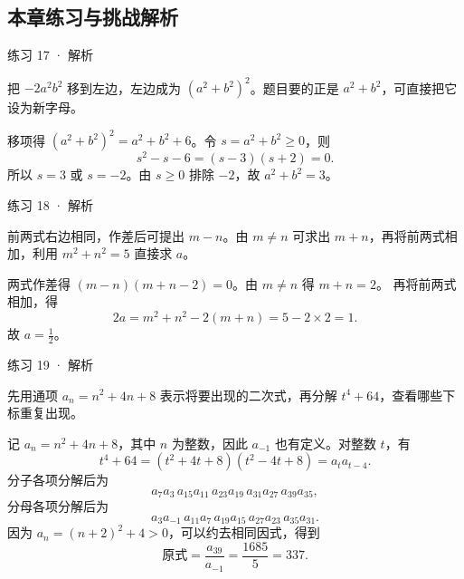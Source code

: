 \subsection*{本章练习与挑战解析}





\begin{solution}[before skip=4pt plus 1pt,after skip=4pt plus 1pt,top=6pt,bottom=6pt]{练习 17 · 解析}

\think 把 $-2a^2b^2$ 移到左边，左边成为 $(a^2+b^2)^2$。题目要的正是 $a^2+b^2$，可直接把它设为新字母。

\solve 移项得 $(a^2+b^2)^2=a^2+b^2+6$。令 $s=a^2+b^2\ge0$，则
\[s^2-s-6=(s-3)(s+2)=0.\]
所以 $s=3$ 或 $s=-2$。由 $s\ge0$ 排除 $-2$，故 $a^2+b^2=3$。


\end{solution}


\begin{solution}[before skip=4pt plus 1pt,after skip=4pt plus 1pt,top=6pt,bottom=6pt]{练习 18 · 解析}

\think 前两式右边相同，作差后可提出 $m-n$。由 $m\ne n$ 可求出 $m+n$，再将前两式相加，利用 $m^2+n^2=5$ 直接求 $a$。

\solve 两式作差得 $(m-n)(m+n-2)=0$。由 $m\ne n$ 得 $m+n=2$。
再将前两式相加，得
\[2a=m^2+n^2-2(m+n)=5-2\times2=1.\]
故 $a=\frac12$。


\end{solution}




\begin{solution}[before skip=4pt plus 1pt,after skip=4pt plus 1pt,top=6pt,bottom=6pt]{练习 19 · 解析}

\think 先用通项 $a_n=n^2+4n+8$ 表示将要出现的二次式，再分解 $t^4+64$，查看哪些下标重复出现。

\solve 记 $a_n=n^2+4n+8$，其中 $n$ 为整数，因此 $a_{-1}$ 也有定义。对整数 $t$，有
\[t^4+64=(t^2+4t+8)(t^2-4t+8)=a_ta_{t-4}.\]
分子各项分解后为
\[a_7a_3\,a_{15}a_{11}\,a_{23}a_{19}\,a_{31}a_{27}\,a_{39}a_{35},\]
分母各项分解后为
\[a_3a_{-1}\,a_{11}a_7\,a_{19}a_{15}\,a_{27}a_{23}\,a_{35}a_{31}.\]
因为 $a_n=(n+2)^2+4>0$，可以约去相同因式，得到
\[\text{原式}=\frac{a_{39}}{a_{-1}}=\frac{1685}{5}=337.\]


\end{solution}

